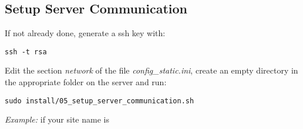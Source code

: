 \subsection{Setup Server Communication}

If not already done, generate a ssh key with:
\begin{lstlisting}
ssh -t rsa
\end{lstlisting}

Edit the section \textit{network} of the file \textit{config\_static.ini}, 
create an empty directory in the appropriate folder on the server and run: 
\begin{lstlisting}
sudo install/05_setup_server_communication.sh
\end{lstlisting}

\textit{Example:} if your site name is 









 
